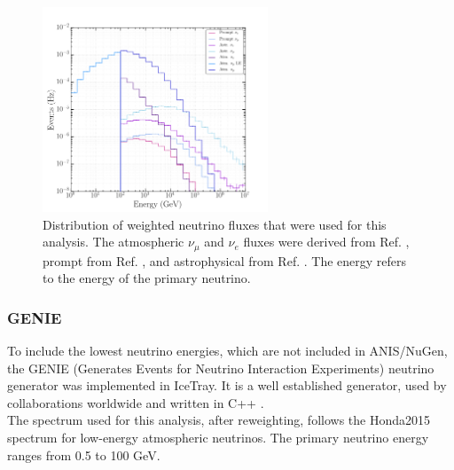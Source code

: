 \begin{figure}
\centering
\includegraphics[width=0.6\textwidth]{chapter6/img/neutrinoenergy.png}
\caption{Distribution of weighted neutrino fluxes that were used for this analysis. The atmospheric $\nu_\mu$ and $\nu_e$ fluxes were derived from Ref. \cite{Honda:2006qj}, prompt from Ref. \cite{Enberg:2008te}, and astrophysical from Ref. \cite{Aartsen:2014gkd}. The energy refers to the energy of the primary neutrino.}
\label{fig:neutrinospectrum}
\end{figure}

\subsubsection{GENIE}
To include the lowest neutrino energies, which are not included in ANIS/NuGen, the GENIE (Generates Events for Neutrino Interaction Experiments) neutrino generator was implemented in IceTray. It is a well established generator, used by collaborations worldwide and written in C++ \cite{Andreopoulos:2009rq,Andreopoulos:2015wxa}.\\

\noindent The spectrum used for this analysis, after reweighting, follows the Honda2015 spectrum \cite{Honda:2015fha} for low-energy atmospheric neutrinos. The primary neutrino energy ranges from 0.5 to 100 GeV.

